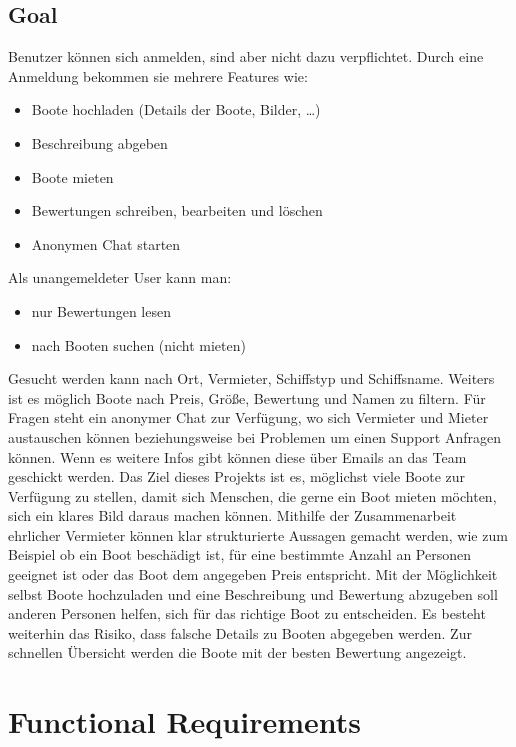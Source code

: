 \documentclass[12pt]{article}
\theoremstyle{definition}
\begin{document}
\subsection{Goal}
	Benutzer können sich anmelden, sind aber nicht dazu verpflichtet. Durch eine Anmeldung
	bekommen sie mehrere Features wie:
	\begin{itemize}
		\item Boote hochladen (Details der Boote, Bilder, …)
		\item Beschreibung abgeben
		\item Boote mieten
		\item Bewertungen schreiben, bearbeiten und löschen
		\item Anonymen Chat starten
	\end{itemize}
	Als unangemeldeter User kann man:
	\begin{itemize}
		\item nur Bewertungen lesen
		\item nach Booten suchen (nicht mieten)
	\end{itemize}
	Gesucht werden kann nach Ort, Vermieter, Schiffstyp und Schiffsname. Weiters ist es möglich Boote nach Preis, Größe, Bewertung und Namen zu filtern.
	Für Fragen steht ein anonymer Chat zur Verfügung, wo sich Vermieter und Mieter austauschen können beziehungsweise bei Problemen um einen Support Anfragen können. Wenn es weitere Infos gibt können diese über Emails an das Team geschickt werden.
	Das Ziel dieses Projekts ist es, möglichst viele Boote zur Verfügung zu stellen, damit sich Menschen, die gerne ein Boot mieten möchten, sich ein klares Bild daraus machen können. Mithilfe der Zusammenarbeit ehrlicher Vermieter können klar strukturierte Aussagen gemacht werden, wie zum Beispiel ob ein Boot beschädigt ist, für eine bestimmte Anzahl an Personen geeignet ist oder das Boot dem angegeben Preis entspricht. Mit der Möglichkeit selbst Boote hochzuladen und eine Beschreibung und Bewertung abzugeben soll anderen Personen helfen, sich für das richtige Boot zu entscheiden. Es besteht weiterhin das Risiko, dass falsche Details zu Booten abgegeben werden. Zur schnellen Übersicht werden die Boote mit der besten Bewertung angezeigt.
\pagebreak

\section{Functional Requirements}
\end{document}
